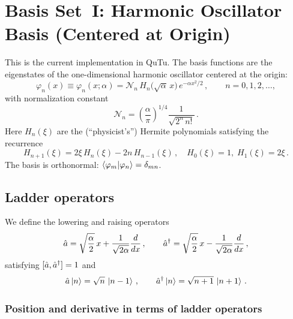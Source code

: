 \section{Basis Set~I: Harmonic Oscillator Basis (Centered at Origin)}\label{sec:HO}

This is the current implementation in QuTu. The basis functions are the eigenstates of the
one-dimensional harmonic oscillator centered at the origin:
\begin{equation}\label{eq:HO_basis}
  \varphi_n(x) \equiv \varphi_n(x;\alpha)
  = \mathcal{N}_n\,H_n\!\bigl(\sqrt{\alpha}\,x\bigr)\,e^{-\alpha x^2/2}\,,
  \qquad n = 0, 1, 2, \ldots,
\end{equation}
with normalization constant
\begin{equation}\label{eq:Nn}
  \mathcal{N}_n = \left(\frac{\alpha}{\pi}\right)^{1/4}\frac{1}{\sqrt{2^n\,n!}}\,.
\end{equation}
Here $H_n(\xi)$ are the (``physicist's'') Hermite polynomials satisfying the recurrence
\begin{equation}
  H_{n+1}(\xi) = 2\xi\,H_n(\xi) - 2n\,H_{n-1}(\xi)\,,\quad
  H_0(\xi) = 1,\;H_1(\xi) = 2\xi\,.
\end{equation}
The basis is orthonormal: $\braket{\varphi_m}{\varphi_n} = \delta_{mn}$.

\subsection{Ladder operators}\label{sec:ladder}

We define the lowering and raising operators
\begin{equation}\label{eq:ladder_def}
  \hat{a} = \sqrt{\frac{\alpha}{2}}\,x + \frac{1}{\sqrt{2\alpha}}\frac{d}{dx}\,,
  \qquad
  \hat{a}^{\dagger} = \sqrt{\frac{\alpha}{2}}\,x - \frac{1}{\sqrt{2\alpha}}\frac{d}{dx}\,,
\end{equation}
satisfying $[\hat{a}, \hat{a}^{\dagger}] = 1$ and
\begin{equation}
  \hat{a}\ket{n} = \sqrt{n}\,\ket{n-1}\,,\qquad
  \hat{a}^{\dagger}\ket{n} = \sqrt{n+1}\,\ket{n+1}\,.
\end{equation}

\subsubsection{Position and derivative in terms of ladder operators}

